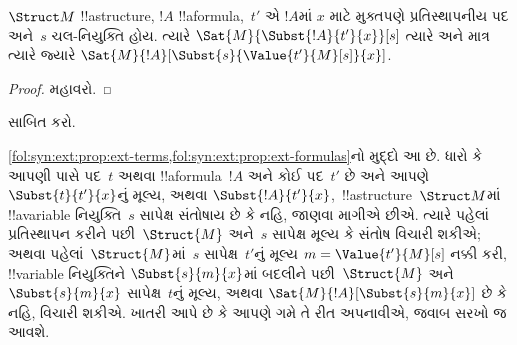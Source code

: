 \documentclass[../../../include/open-logic-section]{subfiles}
\begin{document}
\begin{prop} $\Struct M$ !!a{structure},
$!A$ !!a{formula},~$t'$ એ $!A$માં $x$ માટે મુક્તપણે પ્રતિસ્થાપનીય પદ
અને~$s$ ચલ-નિયુક્તિ હોય. ત્યારે
$\Sat{M}{\Subst{!A}{t'}{x}}[s]$ ત્યારે અને માત્ર ત્યારે જ્યારે
$\Sat{M}{!A}[\Subst{s}{\Value{t'}{M}[s]}{x}]$.
\end{prop}

\begin{proof}
મહાવરો.
\end{proof}

\begin{prob}
 સાબિત કરો.
\end{prob}

\begin{explain}
  \cref{fol:syn:ext:prop:ext-terms,fol:syn:ext:prop:ext-formulas}નો
  મુદ્દો આ છે. ધારો કે આપણી પાસે પદ~$t$ અથવા !!a{formula}~$!A$ અને કોઈ
  પદ~$t'$ છે અને આપણે $\Subst{t}{t'}{x}$નું મૂલ્ય, અથવા
  $\Subst{!A}{t'}{x}$,~!!a{structure}~$\Struct M$માં !!a{variable}
  નિયુક્તિ~$s$ સાપેક્ષ સંતોષાય છે કે નહિ, જાણવા માગીએ છીએ. ત્યારે
  પહેલાં પ્રતિસ્થાપન કરીને પછી~$\Struct{M}$ અને~$s$ સાપેક્ષ મૂલ્ય કે
  સંતોષ વિચારી શકીએ; અથવા પહેલાં~$\Struct{M}$માં~$s$ સાપેક્ષ~$t'$નું
  મૂલ્ય $m=\Value{t'}{M}[s]$ નક્કી કરી, !!{variable} નિયુક્તિને
  $\Subst{s}{m}{x}$માં બદલીને પછી~$\Struct{M}$ અને
  $\Subst{s}{m}{x}$ સાપેક્ષ~$t$નું મૂલ્ય, અથવા
  $\Sat{M}{!A}[\Subst{s}{m}{x}]$ છે કે નહિ, વિચારી શકીએ.
  ખાતરી આપે છે કે આપણે ગમે તે રીત અપનાવીએ, જવાબ સરખો જ આવશે.
\end{explain}
\end{document}
